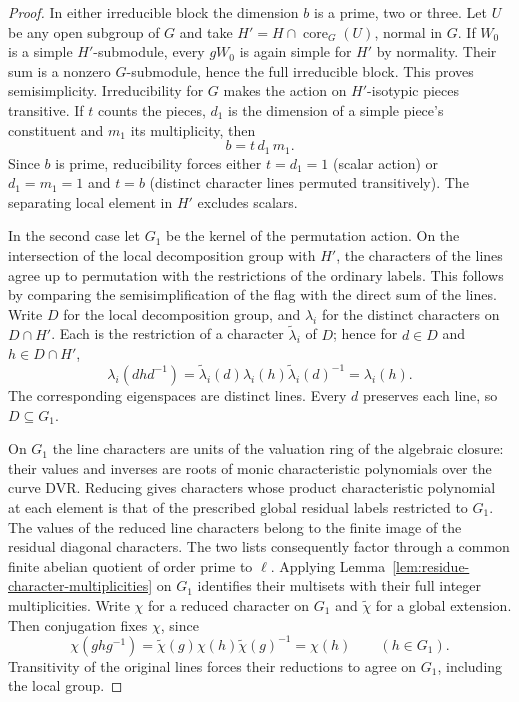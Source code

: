\begin{proof}
In either irreducible block the dimension \(b\) is a prime, two or
three. Let \(U\) be any open subgroup of \(G\) and take
\(H'=H\cap\operatorname{core}_G(U)\), normal in \(G\).
If \(W_0\) is a simple \(H'\)-submodule, every \(gW_0\)
is again simple for \(H'\) by normality. Their sum is a
nonzero \(G\)-submodule, hence the full irreducible block.
This proves semisimplicity. Irreducibility for \(G\) makes
the action on \(H'\)-isotypic pieces transitive. If \(t\)
counts the pieces, \(d_1\) is the dimension of a simple
piece's constituent and \(m_1\) its multiplicity, then
\[
                             b=t\,d_1\,m_1 .
\]
Since \(b\) is prime, reducibility forces either \(t=d_1=1\)
(scalar action) or \(d_1=m_1=1\) and \(t=b\) (distinct
character lines permuted transitively).
The separating local element in \(H'\) excludes scalars.

In the
second case let \(G_1\) be the kernel of the permutation action.
On the intersection of the local decomposition group with \(H'\),
the characters of the lines agree up to permutation with the
restrictions of the ordinary labels. This follows by comparing
the semisimplification of the flag with the direct sum of the lines.
Write \(D\) for the local decomposition group, and \(\lambda_i\) for the distinct characters on \(D\cap H'\). Each is the restriction of a character \(\widetilde\lambda_i\) of \(D\); hence for \(d\in D\) and \(h\in D\cap H'\),
\[
 \lambda_i(dhd^{-1})=\widetilde\lambda_i(d)\lambda_i(h)\widetilde\lambda_i(d)^{-1}
 =\lambda_i(h).
\]
The corresponding eigenspaces are distinct lines. Every \(d\) preserves each line, so \(D\subseteq G_1\).

On \(G_1\) the line characters are units of the valuation ring of the
algebraic closure: their values and inverses are roots of monic
characteristic polynomials over the curve DVR. Reducing gives
characters whose product characteristic polynomial at each element
is that of the prescribed global residual labels restricted to
\(G_1\). The values of the reduced line characters belong to the finite image of the residual diagonal characters. The two lists consequently factor through a common finite abelian quotient of order prime to \(\ell\). Applying Lemma~\ref{lem:residue-character-multiplicities} on \(G_1\) identifies their multisets with their full integer multiplicities. Write \(\chi\) for a reduced character on \(G_1\) and \(\tilde\chi\) for a global extension. Then conjugation fixes \(\chi\), since
\[
 \chi(ghg^{-1})=\tilde\chi(g)\chi(h)\tilde\chi(g)^{-1}=\chi(h)\qquad(h\in G_1).
\] Transitivity of the original lines forces their
reductions to agree on \(G_1\), including the local group.


\end{proof}

